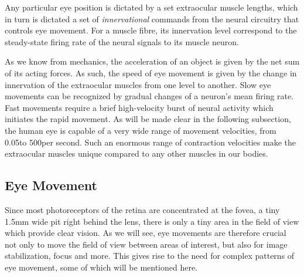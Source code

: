 Any particular eye position is dictated by a set extraocular muscle lengths, which in turn is dictated a set of \textit{innervational} commands from the neural circuitry that controls eye movement. For a muscle fibre, its innervation level correspond to the steady-state firing rate of the neural signals to its muscle neuron. 


As we know from mechanics, the acceleration of an object is given by the net sum of its acting forces. As such, the speed of eye movement is given by the change in innervation of the extraocular muscles from one level to another. Slow eye movements can be recognized by gradual changes of a neuron's mean firing rate. Fast movements require a brief high-velocity burst of neural activity which initiates the rapid movement. 
As will be made clear in the following subsection, the human eye is capable of a very wide range of movement velocities, from 0.05\degree to 500\degree per second. Such an enormous range of contraction velocities make the extraocular muscles unique compared to any other muscles in our bodies.


\subsection{Eye Movement}
Since most photoreceptors of the retina are concentrated at the fovea, a tiny 1.5mm wide pit right behind the lens, there is only a tiny area in the field of view which provide clear vision. As we will see, eye movements are therefore crucial not only to move the field of view between areas of interest, but also for image stabilization, focus and more. This gives rise to the need for complex patterns of eye movement, some of which will be mentioned here.

